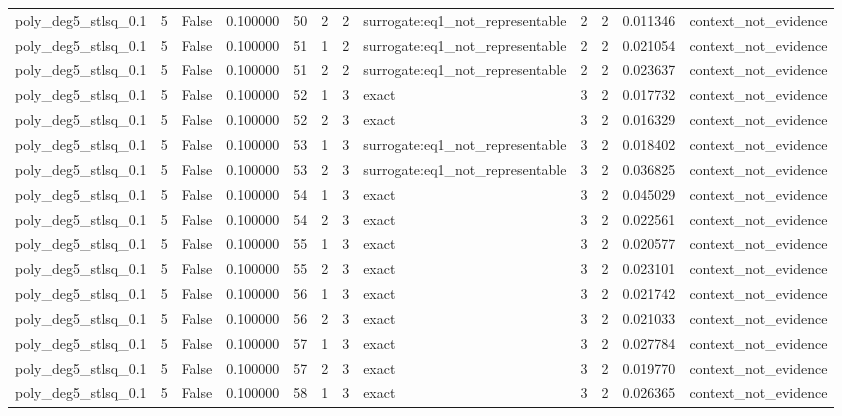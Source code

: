 \begin{tabular}{lrrrrrrlrrrl}
poly\_deg5\_stlsq\_0.1 & 5 & False & 0.100000 & 50 & 2 & 2 & surrogate:eq1\_not\_representable & 2 & 2 & 0.011346 & context\_not\_evidence \\
poly\_deg5\_stlsq\_0.1 & 5 & False & 0.100000 & 51 & 1 & 2 & surrogate:eq1\_not\_representable & 2 & 2 & 0.021054 & context\_not\_evidence \\
poly\_deg5\_stlsq\_0.1 & 5 & False & 0.100000 & 51 & 2 & 2 & surrogate:eq1\_not\_representable & 2 & 2 & 0.023637 & context\_not\_evidence \\
poly\_deg5\_stlsq\_0.1 & 5 & False & 0.100000 & 52 & 1 & 3 & exact & 3 & 2 & 0.017732 & context\_not\_evidence \\
poly\_deg5\_stlsq\_0.1 & 5 & False & 0.100000 & 52 & 2 & 3 & exact & 3 & 2 & 0.016329 & context\_not\_evidence \\
poly\_deg5\_stlsq\_0.1 & 5 & False & 0.100000 & 53 & 1 & 3 & surrogate:eq1\_not\_representable & 3 & 2 & 0.018402 & context\_not\_evidence \\
poly\_deg5\_stlsq\_0.1 & 5 & False & 0.100000 & 53 & 2 & 3 & surrogate:eq1\_not\_representable & 3 & 2 & 0.036825 & context\_not\_evidence \\
poly\_deg5\_stlsq\_0.1 & 5 & False & 0.100000 & 54 & 1 & 3 & exact & 3 & 2 & 0.045029 & context\_not\_evidence \\
poly\_deg5\_stlsq\_0.1 & 5 & False & 0.100000 & 54 & 2 & 3 & exact & 3 & 2 & 0.022561 & context\_not\_evidence \\
poly\_deg5\_stlsq\_0.1 & 5 & False & 0.100000 & 55 & 1 & 3 & exact & 3 & 2 & 0.020577 & context\_not\_evidence \\
poly\_deg5\_stlsq\_0.1 & 5 & False & 0.100000 & 55 & 2 & 3 & exact & 3 & 2 & 0.023101 & context\_not\_evidence \\
poly\_deg5\_stlsq\_0.1 & 5 & False & 0.100000 & 56 & 1 & 3 & exact & 3 & 2 & 0.021742 & context\_not\_evidence \\
poly\_deg5\_stlsq\_0.1 & 5 & False & 0.100000 & 56 & 2 & 3 & exact & 3 & 2 & 0.021033 & context\_not\_evidence \\
poly\_deg5\_stlsq\_0.1 & 5 & False & 0.100000 & 57 & 1 & 3 & exact & 3 & 2 & 0.027784 & context\_not\_evidence \\
poly\_deg5\_stlsq\_0.1 & 5 & False & 0.100000 & 57 & 2 & 3 & exact & 3 & 2 & 0.019770 & context\_not\_evidence \\
poly\_deg5\_stlsq\_0.1 & 5 & False & 0.100000 & 58 & 1 & 3 & exact & 3 & 2 & 0.026365 & context\_not\_evidence \\

\end{tabular}
